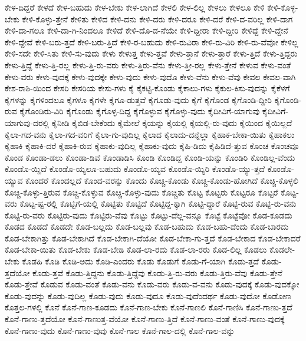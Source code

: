 {ಕೇಳ-ದಿದ್ದರೆ
ಕೇಳದೆ
ಕೇಳ-ಬಹುದು
ಕೇಳ-ಬೇಕು
ಕೇಳ-ಲಾಗಿದೆ
ಕೇಳಲಿ
ಕೇಳ-ಲಿಲ್ಲ
ಕೇಳಲು
ಕೇಳಲೂ
ಕೇಳಿ
ಕೇಳಿ-ಕೊಳ್ಳ-ಬೇಕು
ಕೇಳಿ-ಕೊಳ್ಳು-ತ್ತೇನೆ
ಕೇಳಿತು
ಕೇಳಿದ
ಕೇಳಿ-ದನು
ಕೇಳಿ-ದರು
ಕೇಳಿ-ದರೂ
ಕೇಳಿ-ದರೆ
ಕೇಳಿ-ದ-ವರಿಲ್ಲ
ಕೇಳಿ-ದಾಗ
ಕೇಳಿ-ದಾ-ಗಲೂ
ಕೇಳಿ-ದಾ-ಗಿ-ನಿಂದಲೂ
ಕೇಳಿದೆ
ಕೇಳಿ-ದೊ-ಡ-ನೆಯೇ
ಕೇಳಿ-ದ್ದೀರಾ
ಕೇಳಿ-ದ್ದೀರಿ
ಕೇಳಿದ್ದೆ
ಕೇಳಿ-ದ್ದೇನೆ
ಕೇಳಿ-ದ್ದೇವೆ
ಕೇಳಿ-ಬರು-ತ್ತದೆ
ಕೇಳಿ-ಬರು-ತ್ತಿದೆ
ಕೇಳಿ-ರ-ಬಹುದು
ಕೇಳಿ-ರುವಿರಾ
ಕೇಳಿ-ರು-ವಿರಿ
ಕೇಳಿ-ರು-ವೆವೋ
ಕೇಳಿಲ್ಲ
ಕೇಳಿ-ಸದೇ
ಕೇಳಿ-ಸಿತು
ಕೇಳಿ-ಸು-ವುದು
ಕೇಳು
ಕೇಳುತ್ತ
ಕೇಳು-ತ್ತವೆ
ಕೇಳು-ತ್ತಾನೆ
ಕೇಳು-ತ್ತಾರೆ
ಕೇಳು-ತ್ತಿದೆ
ಕೇಳು-ತ್ತಿದ್ದರು
ಕೇಳು-ತ್ತಿದ್ದೆ
ಕೇಳು-ತ್ತಿ-ರಲ್ಲ
ಕೇಳು-ತ್ತಿ-ರು-ವರು
ಕೇಳು-ತ್ತಿರು-ವೆನು
ಕೇಳು-ತ್ತೀ-ರಲ್ಲ
ಕೇಳು-ತ್ತೇನೆ
ಕೇಳುವ
ಕೇಳು-ವಂತೆ
ಕೇಳು-ವರು
ಕೇಳು-ವುದಕ್ಕೆ
ಕೇಳು-ವುದಕ್ಕೇ
ಕೇಳು-ವುದು
ಕೇಳು-ವುದೊ
ಕೇಳು-ವೆನು
ಕೇಳು-ವೆವು
ಕೇವಲ
ಕೇವಲ-ವಾಗಿ
ಕೇಶ-ರಾಶಿ-ಯಿಂದ
ಕೇಸರಿ
ಕೇಸರಿಯ
ಕೇಸು-ಗಳು
ಕೈ
ಕೈಕಟ್ಟಿ-ಕೊಂಡು
ಕೈಕಾಲು-ಗಳು
ಕೈಕುಲ-ಕಿಸು-ವುದನ್ನು
ಕೈಕೆಳಗೆ
ಕೈಗಳನ್ನು
ಕೈಗಳಿಂದಲೂ
ಕೈಗಳೂ
ಕೈಗಳೇ
ಕೈಗೂ-ಡುತ್ತವೆ
ಕೈಗೂಡು-ವುದು
ಕೈಗೆ
ಕೈಗೊಂಡ
ಕೈಗೊಂಡಿ-ದ್ದೀರಿ
ಕೈಗೊಂಡಿ-ರುವ
ಕೈಗೊಂಡಿರು-ವಿರಿ
ಕೈಗೊಂಡು
ಕೈಗೊಳ್ಳ-ದಿದ್ದ
ಕೈಗೊಳ್ಳುವ
ಕೈಗೊಳ್ಳು-ವುದು
ಕೈದೀವಿಗೆ-ಯಾಗುವು
ಕೈದೀವಿಗೆ-ಯಾಗುವು-ದರಲ್ಲಿ
ಕೈನೀಡಿ
ಕೈಬಿಡ-ಬೇಕೆಂದು
ಕೈಮೇಲೆ
ಕೈಯನ್ನು
ಕೈಯಲ್ಲಿ
ಕೈಯಲ್ಲಿ-ರು-ವುದು
ಕೈಯಿಂದ
ಕೈಯಿಲ್ಲದೆ
ಕೈಲಾ-ಗದ-ವನು
ಕೈಲಾ-ಗದ-ವರಿಗೆ
ಕೈಲಾ-ಗು-ವುದಿಲ್ಲ
ಕೈಲಾದ
ಕೈಲಾದು-ದನ್ನೆಲ್ಲಾ
ಕೈಹಾಕ-ಬೇಕಾ-ಯಿತು
ಕೈಹಾಕಲು
ಕೈಹಾಕಿ
ಕೈಹಾಕಿ-ದರೆ
ಕೈಹಾಕಿ-ರುವ
ಕೈಹಾಕು-ವುದಿಲ್ಲ
ಕೈಹಾಕು-ವುದು
ಕೈಹಿ-ಡಿದು
ಕೈಹಿಡಿದೆ-ತ್ತುವ
ಕೊಂಚ
ಕೊಂಚವೂ
ಕೊಂಡ
ಕೊಂಡಾ-ಡಲು
ಕೊಂಡಾ-ಡಿವೆ
ಕೊಂಡಾಡಿಸಿ
ಕೊಂಡಿ
ಕೊಂಡಿದ್ದ
ಕೊಂಡಿ-ಯನ್ನು
ಕೊಂಡಿರಿ
ಕೊಂಡಿಲ್ಲ-ವೆಂದು
ಕೊಂಡೊ-ಯ್ದಿದೆ
ಕೊಂಡೊ-ಯ್ಯಲೂ-ಬಹುದು
ಕೊಂಡೊ-ಯ್ಯವ
ಕೊಂಡೊ-ಯ್ಯಿರಿ
ಕೊಂಡೊ-ಯ್ಯು-ತ್ತದೆ
ಕೊಂಡೊ-ಯ್ಯುವ
ಕೊಂದರೆ
ಕೊಂದಲ್ಲದೆ
ಕೊಂದ-ವರನ್ನು
ಕೊಂದು
ಕೊಚ್ಚಿ-ಕೊಂಡು
ಕೊಚ್ಚಿ-ಕೊಂಡು-ಹೋಗಿದೆ
ಕೊಚ್ಚಿ-ಕೊಳ್ಳಲಿ
ಕೊಚ್ಚಿ-ಕೊಳ್ಳು-ತ್ತಿರುವ
ಕೊಚ್ಚಿ-ಕೊಳ್ಳುವ
ಕೊಚ್ಚಿ-ಕೊಳ್ಳು-ವುದು
ಕೊಚ್ಚಿತು
ಕೊಟ್ಟ
ಕೊಟ್ಟರು
ಕೊಟ್ಟರೂ
ಕೊಟ್ಟರೆ
ಕೊಟ್ಟ-ವರು
ಕೊಟ್ಟ-ಷ್ಟ-ರಲ್ಲಿ
ಕೊಟ್ಟಿಗೆ-ಯಲ್ಲಿ
ಕೊಟ್ಟಿತು
ಕೊಟ್ಟಿದೆ
ಕೊಟ್ಟಿದ್ದ-ಕ್ಕಾಗಿ
ಕೊಟ್ಟಿ-ದ್ದಾರೆ
ಕೊಟ್ಟಿ-ರುವ
ಕೊಟ್ಟಿ-ರು-ವನು
ಕೊಟ್ಟಿ-ರು-ವರು
ಕೊಟ್ಟಿರು-ವುದು
ಕೊಟ್ಟಿರು-ವೆವು
ಕೊಟ್ಟು
ಕೊಟ್ಟು-ದೆಲ್ಲ-ವನ್ನೂ
ಕೊಟ್ಟೆ
ಕೊಟ್ಟೆವೋ
ಕೊಡ-ಕೂಡದು
ಕೊಡದ
ಕೊಡದೆ
ಕೊಡದೇ
ಕೊಡ-ಬಲ್ಲದು
ಕೊಡ-ಬಲ್ಲವು
ಕೊಡ-ಬಹುದು
ಕೊಡ-ಬಹು-ದೆಂದು
ಕೊಡ-ಬಾರದು
ಕೊಡ-ಬೇಕಾಗಿತ್ತು
ಕೊಡ-ಬೇಕಾಗಿದೆ
ಕೊಡ-ಬೇಕಾಗಿ-ದೆಯೋ
ಕೊಡ-ಬೇಕಾ-ಗು-ತ್ತದೆ
ಕೊಡ-ಬೇಕಾದ
ಕೊಡ-ಬೇಕಾದರೆ
ಕೊಡ-ಬೇಕಾ-ಯಿತು
ಕೊಡ-ಬೇಕು
ಕೊಡ-ಬೇಡಿ
ಕೊಡ-ಲಾ-ರದು
ಕೊಡ-ಲಾ-ರರು
ಕೊಡ-ಲಿಲ್ಲ
ಕೊಡಲು
ಕೊಡಲೇ-ಬೇಕು
ಕೊಡಹಿ
ಕೊಡಿ
ಕೊಡಿ-ಅದು
ಕೊಡಿ-ಎಂದರು
ಕೊಡು
ಕೊಡುಗೆ
ಕೊಡು-ಗೆ-ಯಾಗಿ
ಕೊಡು-ತ್ತದೆ
ಕೊಡು-ತ್ತದೆಯೋ
ಕೊಡು-ತ್ತವೆ
ಕೊಡು-ತ್ತಿದ್ದನು
ಕೊಡು-ತ್ತಿದ್ದೆವು
ಕೊಡು-ತ್ತಿ-ರು-ವರು
ಕೊಡು-ತ್ತಿರು-ವೆವು
ಕೊಡು-ತ್ತೇನೆ
ಕೊಡು-ತ್ತೇವೆ
ಕೊಡುವ
ಕೊಡು-ವಂತೆ
ಕೊಡು-ವನು
ಕೊಡು-ವರು
ಕೊಡು-ವ-ವನು
ಕೊಡು-ವುದಕ್ಕೆ
ಕೊಡು-ವುದಕ್ಕೋ
ಕೊಡು-ವುದನ್ನು
ಕೊಡು-ವುದಿಲ್ಲ
ಕೊಡು-ವುದು
ಕೊಡು-ವುದೂ
ಕೊಡು-ವುದೆಂದರ್ಥ
ಕೊಡು-ವುದೋ
ಕೊಡೋಣ
ಕೊತ್ತಲ-ಗಳಲ್ಲಿ
ಕೊನೆ
ಕೊನೆ-ಗಾಣ-ಕೂಡದು
ಕೊನೆ-ಗಾಣ-ಬೇಕು
ಕೊನೆ-ಗಾಣಲಿ
ಕೊನೆ-ಗಾಣಿಸಿ
ಕೊನೆ-ಗಾಣು-ತ್ತದೆ
ಕೊನೆ-ಗಾಣು-ತ್ತದೆಯೋ
ಕೊನೆ-ಗಾಣುತ್ತ-ವೆಯೋ
ಕೊನೆ-ಗಾಣು-ತ್ತಿದೆ
ಕೊನೆ-ಗಾಣು-ವಂತೆ
ಕೊನೆ-ಗಾಣು-ವುದಕ್ಕೆ
ಕೊನೆ-ಗಾಣು-ವುದು
ಕೊನೆ-ಗಾಣು-ವುವು
ಕೊನೆ-ಗಾಲ
ಕೊನೆ-ಗಾಲ-ದಲ್ಲಿ
ಕೊನೆ-ಗಾಲ-ವನ್ನು
}
